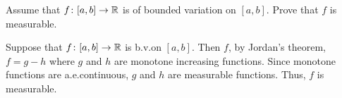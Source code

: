 \begin{problem}
  Assume that \(f\colon[a,b]\to\mathbb{R}\) is of bounded variation on
  \([a,b]\). Prove that \(f\) is measurable.
\end{problem}
\begin{solution}
  Suppose that \(f\colon[a,b]\to\mathbb{R}\) is b.v.\@ on \([a,b]\). Then \(f\),
  by Jordan's theorem, \(f=g-h\) where \(g\) and \(h\) are monotone
  increasing functions. Since monotone functions are a.e.\@ continuous,
  \(g\) and \(h\) are measurable functions. Thus, \(f\) is measurable.
\end{solution}

